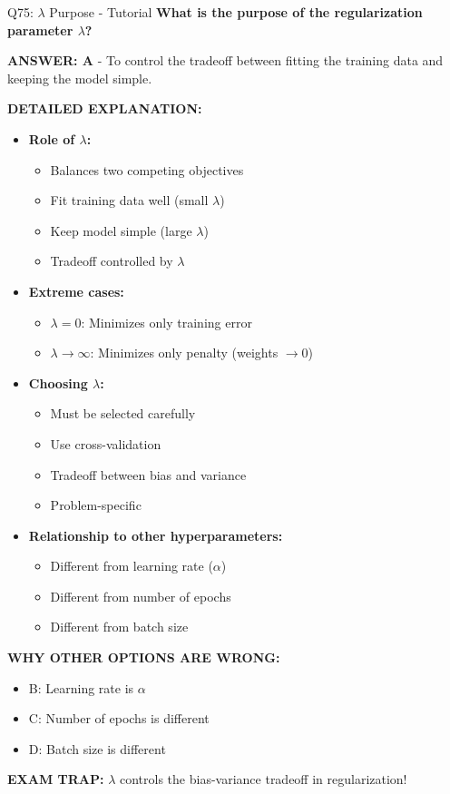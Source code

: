 \documentclass[8pt]{beamer}
\begin{document}
	\begin{frame}{Q75: $\lambda$ Purpose - Tutorial}
		\fontsize{6.5}{7.5}\selectfont
		\textbf{What is the purpose of the regularization parameter $\lambda$?}
		
		\vspace{0.05cm}
		\textcolor{myblue}{\textbf{ANSWER: A}} - To control the tradeoff between fitting the training data and keeping the model simple.
		
		\vspace{0.05cm}
		\textbf{DETAILED EXPLANATION:}
		\begin{itemize}
			\item \textbf{Role of $\lambda$:}
			\begin{itemize}
				\item Balances two competing objectives
				\item Fit training data well (small $\lambda$)
				\item Keep model simple (large $\lambda$)
				\item Tradeoff controlled by $\lambda$
			\end{itemize}
			\item \textbf{Extreme cases:}
			\begin{itemize}
				\item $\lambda = 0$: Minimizes only training error
				\item $\lambda \to \infty$: Minimizes only penalty (weights $\to 0$)
			\end{itemize}
			\item \textbf{Choosing $\lambda$:}
			\begin{itemize}
				\item Must be selected carefully
				\item Use cross-validation
				\item Tradeoff between bias and variance
				\item Problem-specific
			\end{itemize}
			\item \textbf{Relationship to other hyperparameters:}
			\begin{itemize}
				\item Different from learning rate ($\alpha$)
				\item Different from number of epochs
				\item Different from batch size
			\end{itemize}
		\end{itemize}
		
		\vspace{0.05cm}
		\textcolor{myred}{\textbf{WHY OTHER OPTIONS ARE WRONG:}}
		\begin{itemize}
			\item \textcolor{myred}{B:} Learning rate is $\alpha$
			\item \textcolor{myred}{C:} Number of epochs is different
			\item \textcolor{myred}{D:} Batch size is different
		\end{itemize}
		
		\textcolor{myred}{\textbf{EXAM TRAP:}} $\lambda$ controls the bias-variance tradeoff in regularization!
	\end{frame}
	
\end{document}
